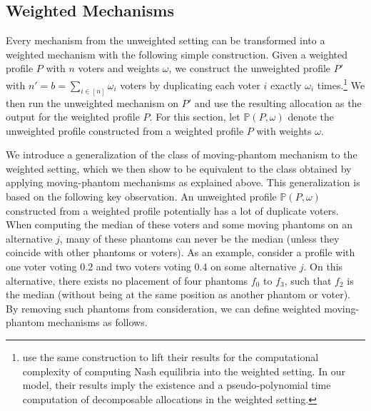 \documentclass[11pt]{article}
\begin{document}
\subsection{Weighted Mechanisms} 

Every mechanism from the unweighted setting can be transformed into a weighted mechanism with the following simple construction. Given a weighted profile $P$ with $n$ voters and weights $\omega$, we construct the unweighted profile $P'$ with $n' = b = \sum_{i \in [n]} \omega_i$ voters by duplicating each voter $i$ exactly $\omega_i$ times.\footnote{\citet{becker2025efficiently} use the same construction to lift their results for the computational complexity of computing Nash equilibria into the weighted setting. In our model, their results imply the existence and a pseudo-polynomial time computation of decomposable allocations in the weighted setting.} We then run the unweighted mechanism on $P'$ and use the resulting allocation as the output for the weighted profile $P$. For this section, let $\mathbb{P}(P, \omega)$ denote the unweighted profile constructed from a weighted profile $P$ with weights $\omega$.

We introduce a generalization of the class of moving-phantom mechanism to the weighted setting, which we then show to be equivalent to the class obtained by applying moving-phantom mechanisms as explained above. This generalization is based on the following key observation. An unweighted profile $\mathbb{P}(P, \omega)$ constructed from a weighted profile potentially has a lot of duplicate voters. When computing the median of these voters and some moving phantoms on an alternative $j$, many of these phantoms can never be the median (unless they coincide with other phantoms or voters). As an example, consider a profile with one voter voting $0.2$ and two voters voting $0.4$ on some alternative $j$. On this alternative, there exists no placement of four phantoms $f_0$ to $f_3$, such that $f_2$ is the median (without being at the same position as another phantom or voter). By removing such phantoms from consideration, we can define weighted moving-phantom mechanisms as follows.
\end{document}
